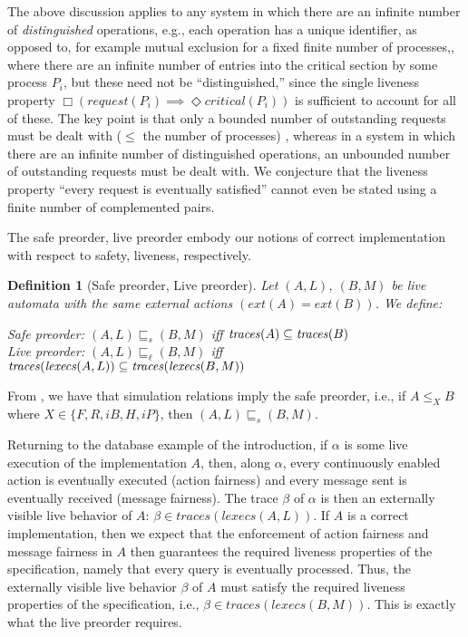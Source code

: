\documentclass[11pt]{article}
\newcommand{\bd}{\begin{definition}}
\newcommand{\ed}{\end{definition}}
\newcommand{\empi}[1]{\textit{#1\/}}
\renewcommand{\l}{\ell}
\newcommand{\al}{\alpha}
\newcommand{\execs}{\mathit{lexecs}}
\newcommand{\ext}{\mathit{ext}}
\newcommand{\traces}{\mathit{traces}}
\newcommand{\lpreorder}{\sqsubseteq_\l}	\newcommand{\spreorder}{\sqsubseteq_s}	\newcommand{\simu}{\leq}
\newcommand{\always}{\Box}
\newcommand{\eventually}{\Diamond}
\newtheorem{definition}{Definition}
\newcommand{\ms}[1]{\relax\ifmmode
                \mathord{\mathcode`\-="702D\it #1\mathcode`\-="2200}\else
{\it #1}\fi
}
\begin{document}
The above discussion applies to any system in which there are an infinite number
of \empi{distinguished} operations, e.g., each operation has a unique
identifier, as opposed to, for example mutual exclusion for a fixed
finite number of processes,, where there
are an infinite number of entries into the critical section by some
process $P_i$, but these need not be ``distinguished,'' since the single
liveness property 
$\always ( request(P_i) \implies \eventually critical(P_i) )$
is sufficient to account for all of these. 
The key point is that only a bounded number of 
outstanding requests must be dealt with ($\le$ the number of
processes) , whereas in 
a system in which there are an infinite number
of {distinguished} operations, an unbounded number of outstanding
requests must be dealt with. We conjecture that the liveness property 
``every request is eventually satisfied'' cannot even be stated using
a finite number of complemented pairs.


The safe preorder, live preorder \cite{GSSL93} embody our notions of correct
implementation with respect to safety, liveness, respectively.

\bd[Safe preorder, Live preorder] Let $(A,L)$, $(B,M)$ be live
automata with the same external actions $(\ext(A) = \ext(B))$.
We define: \ms\\
\ind Safe preorder:  $(A, L) \spreorder (B, M)$ iff
		       $\traces(A) \sub \traces(B)$\\[1.0ex]
\ind Live preorder:  $(A, L) \lpreorder (B, M)$ iff
		       $\traces(\execs(A,L)) \sub \traces(\execs(B,M))$
\label{def:preorders}
\ed
From \cite{LV95,GSSL93}, we have that simulation relations imply the safe
preorder, i.e., if
$A \simu_X B$ where $X \in \{F, R, iB, H, iP\}$, then $(A, L) \spreorder (B, M)$. 



Returning to the database example of the introduction, 
if $\al$ is some live execution of the implementation $A$, 
then, along $\al$, every continuously enabled action is eventually
executed (action fairness) and every message sent is eventually received
(message fairness).
The trace $\beta$ of $\al$ is then an externally visible live
behavior of $A$: $\beta \in \traces(\execs(A,L))$.
If $A$ is a correct implementation, then we expect that the
enforcement of action fairness and message fairness in $A$ then
guarantees the required liveness properties of the specification,
namely that every query is eventually processed. Thus, 
the externally visible live
behavior $\beta$ of $A$ must satisfy the 
required liveness properties of the specification,
i.e.,  $\beta \in \traces(\execs(B,M))$.
This is exactly what the live preorder requires.
\end{document}
